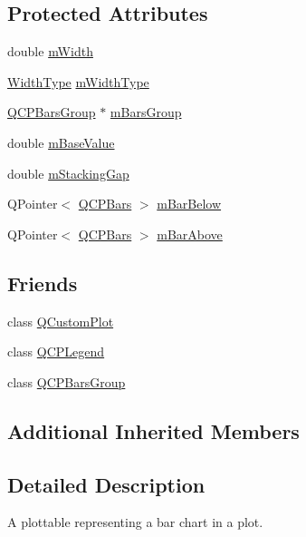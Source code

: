 \subsection*{Protected Attributes}
\begin{DoxyCompactItemize}
\item 
double \hyperlink{class_q_c_p_bars_a7c4e0f2246f8133f48a9c3f24cf5b920}{m\+Width}
\item 
\hyperlink{class_q_c_p_bars_a65dbbf1ab41cbe993d71521096ed4649}{Width\+Type} \hyperlink{class_q_c_p_bars_a94dba1309496c7601d01e2c59715cbb3}{m\+Width\+Type}
\item 
\hyperlink{class_q_c_p_bars_group}{Q\+C\+P\+Bars\+Group} $\ast$ \hyperlink{class_q_c_p_bars_a9f59c255f3739182ca9744dff75beaa9}{m\+Bars\+Group}
\item 
double \hyperlink{class_q_c_p_bars_aa0515cf47fa6044cc28e59b1ae5ec759}{m\+Base\+Value}
\item 
double \hyperlink{class_q_c_p_bars_a2022ddbcf8b464a05d434700a666da18}{m\+Stacking\+Gap}
\item 
Q\+Pointer$<$ \hyperlink{class_q_c_p_bars}{Q\+C\+P\+Bars} $>$ \hyperlink{class_q_c_p_bars_ad51db970eed7e286f2753b0216fc56de}{m\+Bar\+Below}
\item 
Q\+Pointer$<$ \hyperlink{class_q_c_p_bars}{Q\+C\+P\+Bars} $>$ \hyperlink{class_q_c_p_bars_a0c1c46076c41a478dbb373cfd35929aa}{m\+Bar\+Above}
\end{DoxyCompactItemize}
\subsection*{Friends}
\begin{DoxyCompactItemize}
\item 
class \hyperlink{class_q_c_p_bars_a1cdf9df76adcfae45261690aa0ca2198}{Q\+Custom\+Plot}
\item 
class \hyperlink{class_q_c_p_bars_a8429035e7adfbd7f05805a6530ad5e3b}{Q\+C\+P\+Legend}
\item 
class \hyperlink{class_q_c_p_bars_ae1051b4d58a2786cb420367a586e2fee}{Q\+C\+P\+Bars\+Group}
\end{DoxyCompactItemize}
\subsection*{Additional Inherited Members}


\subsection{Detailed Description}
A plottable representing a bar chart in a plot. 



